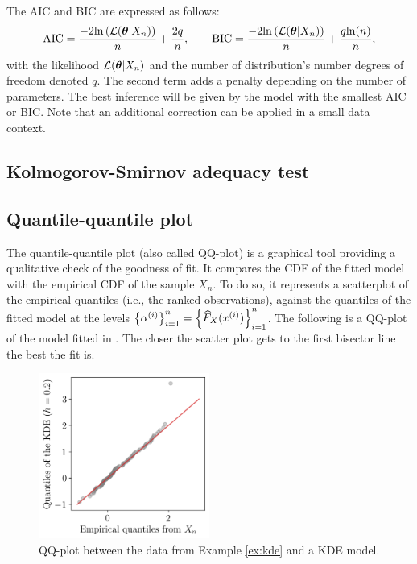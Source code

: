 The AIC and BIC are expressed as follows:
\begin{equation}
    \textrm{AIC} = \frac{-2 \mathrm{ln}\left(\mathcal{L}({\boldsymbol{\theta}}|X_n)\right)}{n} + \frac{2 q}{n},\qquad
    \textrm{BIC} = \frac{-2 \mathrm{ln}\left(\mathcal{L}({\boldsymbol{\theta}}|X_n)\right)}{n} + \frac{q \mathrm{ln}(n)}{n},
\end{equation}
with the likelihood $\mathcal{L}({\boldsymbol{\theta}}|X_n)$ and the number of distribution's number degrees of freedom denoted $q$.
The second term adds a penalty depending on the number of parameters. 
The best inference will be given by the model with the smallest AIC or BIC. 
Note that an additional correction can be applied in a small data context.

\subsection*{Kolmogorov-Smirnov adequacy test}



\subsection*{Quantile-quantile plot}

The quantile-quantile plot (also called QQ-plot) is a graphical tool providing a qualitative check of the goodness of fit.
It compares the CDF of the fitted model with the empirical CDF of the sample $X_n$.
To do so, it represents a scatterplot of the empirical quantiles (i.e., the ranked observations), against the quantiles of the fitted model at the levels 
$\left\{\alpha^{(i)}\right\}_{i=1}^n = \left\{\widehat{F}_X(x^{(i)})\right\}_{i=1}^n$.
The following  is a QQ-plot of the model fitted in . The closer the scatter plot gets to the first bisector line the best the fit is.

\begin{figure}[ht]
    \centering
    \includegraphics[width=0.5\textwidth]{../numerical_experiments/chapter1/figures/qqplot.png}
    \caption{QQ-plot between the data from Example \ref{ex:kde} and a KDE model.}
    \label{fig:KDE}
\end{figure}



